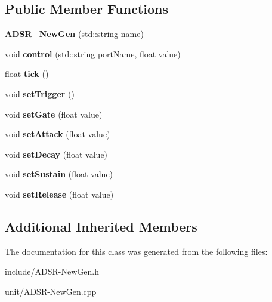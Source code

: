 \subsection*{Public Member Functions}
\begin{DoxyCompactItemize}
\item 
{\bfseries A\+D\+S\+R\+\_\+\+New\+Gen} (std\+::string name)\hypertarget{classunit_1_1ADSR__NewGen_ac8dbe9f3fab627d291ed34996e97d73e}{}\label{classunit_1_1ADSR__NewGen_ac8dbe9f3fab627d291ed34996e97d73e}

\item 
void {\bfseries control} (std\+::string port\+Name, float value)\hypertarget{classunit_1_1ADSR__NewGen_ae5d3a6e3e2be04a470eeb30767e11a58}{}\label{classunit_1_1ADSR__NewGen_ae5d3a6e3e2be04a470eeb30767e11a58}

\item 
float {\bfseries tick} ()\hypertarget{classunit_1_1ADSR__NewGen_a9ec42e7edded490dbe69cbe93883b168}{}\label{classunit_1_1ADSR__NewGen_a9ec42e7edded490dbe69cbe93883b168}

\item 
void {\bfseries set\+Trigger} ()\hypertarget{classunit_1_1ADSR__NewGen_af3002642e550abcfe4be667d027670a9}{}\label{classunit_1_1ADSR__NewGen_af3002642e550abcfe4be667d027670a9}

\item 
void {\bfseries set\+Gate} (float value)\hypertarget{classunit_1_1ADSR__NewGen_a222a12be57cca522ece84deac512c330}{}\label{classunit_1_1ADSR__NewGen_a222a12be57cca522ece84deac512c330}

\item 
void {\bfseries set\+Attack} (float value)\hypertarget{classunit_1_1ADSR__NewGen_aa725e7a7c15ac05c643f3a9df9542c66}{}\label{classunit_1_1ADSR__NewGen_aa725e7a7c15ac05c643f3a9df9542c66}

\item 
void {\bfseries set\+Decay} (float value)\hypertarget{classunit_1_1ADSR__NewGen_aa43684929b80892b7d91ec75303fd00c}{}\label{classunit_1_1ADSR__NewGen_aa43684929b80892b7d91ec75303fd00c}

\item 
void {\bfseries set\+Sustain} (float value)\hypertarget{classunit_1_1ADSR__NewGen_a91036e95f48e88f71973dced76097563}{}\label{classunit_1_1ADSR__NewGen_a91036e95f48e88f71973dced76097563}

\item 
void {\bfseries set\+Release} (float value)\hypertarget{classunit_1_1ADSR__NewGen_af7e268918cef20f67514df7356f0fb15}{}\label{classunit_1_1ADSR__NewGen_af7e268918cef20f67514df7356f0fb15}

\end{DoxyCompactItemize}
\subsection*{Additional Inherited Members}


The documentation for this class was generated from the following files\+:\begin{DoxyCompactItemize}
\item 
include/A\+D\+S\+R-\/\+New\+Gen.\+h\item 
unit/A\+D\+S\+R-\/\+New\+Gen.\+cpp\end{DoxyCompactItemize}
